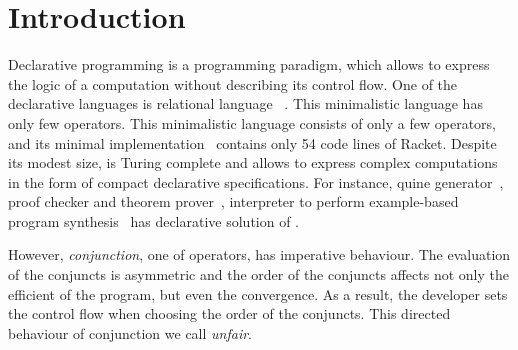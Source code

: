 \section{Introduction}

Declarative programming is a programming paradigm, which allows to express the logic of a computation without describing its control flow. One of the declarative languages is relational language \mk~\cite{fair:TheReasonedSchemer}. This minimalistic language has only few operators. This minimalistic language consists of only a few operators, and its minimal implementation~\cite{fair:micro} contains only 54 code lines of Racket. Despite its modest size, \mk is Turing complete and allows to express complex computations in the form of compact declarative specifications. For instance, quine generator~\cite{fair:quines}, proof checker and theorem prover~\cite{fair:teorem-prover}, interpreter to perform example-based program synthesis~\cite{fair:seven} has declarative solution of \mk.

However, \textit{conjunction}, one of \mk operators, has imperative behaviour. The evaluation of the conjuncts is asymmetric and the order of the conjuncts affects not only the efficient of the program, but even the convergence. As a result, the developer sets the control flow when choosing the order of the conjuncts. This directed behaviour of conjunction we call \textit{unfair}.

